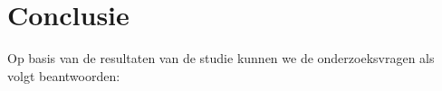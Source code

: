
\chapter{Conclusie}%
\label{ch:conclusie}


Op basis van de resultaten van de studie kunnen we de onderzoeksvragen als volgt beantwoorden:

